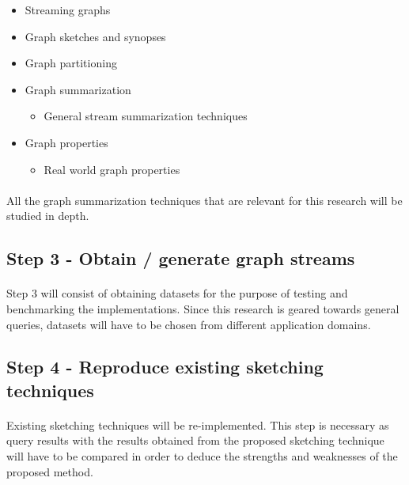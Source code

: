 \begin{itemize}
    \item Streaming graphs
    \item Graph sketches and synopses
    \item Graph partitioning
    \item Graph summarization
          \begin{itemize}
              \item General stream summarization techniques
          \end{itemize}
    \item Graph properties
          \begin{itemize}
              \item Real world graph properties
          \end{itemize}
\end{itemize}

\paragraph{}
All the graph summarization techniques that are relevant for this research will be studied in depth.

\subsection*{Step 3 - Obtain / generate graph streams}

\paragraph{}
Step 3 will consist of obtaining datasets for the purpose of testing and benchmarking the implementations. Since this research is geared towards general queries, datasets will have to be chosen from different application domains.

\subsection*{Step 4 - Reproduce existing sketching techniques}

\paragraph{}
Existing sketching techniques will be re-implemented. This step is necessary as query results with the results obtained from the proposed sketching technique will have to be compared in order to deduce the strengths and weaknesses of the proposed method.

